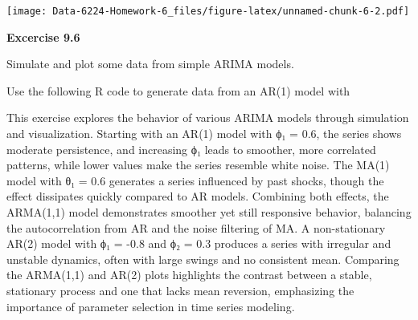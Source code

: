 \documentclass[
]{article}
\newenvironment{Shaded}{\begin{snugshade}}{\end{snugshade}}
\newcommand{\AttributeTok}[1]{\textcolor[rgb]{0.13,0.29,0.53}{#1}}
\newcommand{\DecValTok}[1]{\textcolor[rgb]{0.00,0.00,0.81}{#1}}
\newcommand{\FunctionTok}[1]{\textcolor[rgb]{0.13,0.29,0.53}{\textbf{#1}}}
\newcommand{\NormalTok}[1]{#1}
\newcommand{\SpecialCharTok}[1]{\textcolor[rgb]{0.81,0.36,0.00}{\textbf{#1}}}
\newcommand{\StringTok}[1]{\textcolor[rgb]{0.31,0.60,0.02}{#1}}
\begin{document}
\begin{Shaded}
\end{Shaded}

\texttt{[image: Data-6224-Homework-6\_files/figure-latex/unnamed-chunk-6-2.pdf]}

\textbf{Excercise 9.6}

Simulate and plot some data from simple ARIMA models.

Use the following R code to generate data from an AR(1) model with

This exercise explores the behavior of various ARIMA models through
simulation and visualization. Starting with an AR(1) model with ϕ₁ =
0.6, the series shows moderate persistence, and increasing ϕ₁ leads to
smoother, more correlated patterns, while lower values make the series
resemble white noise. The MA(1) model with θ₁ = 0.6 generates a series
influenced by past shocks, though the effect dissipates quickly compared
to AR models. Combining both effects, the ARMA(1,1) model demonstrates
smoother yet still responsive behavior, balancing the autocorrelation
from AR and the noise filtering of MA. A non-stationary AR(2) model with
ϕ₁ = -0.8 and ϕ₂ = 0.3 produces a series with irregular and unstable
dynamics, often with large swings and no consistent mean. Comparing the
ARMA(1,1) and AR(2) plots highlights the contrast between a stable,
stationary process and one that lacks mean reversion, emphasizing the
importance of parameter selection in time series modeling.
\end{document}
